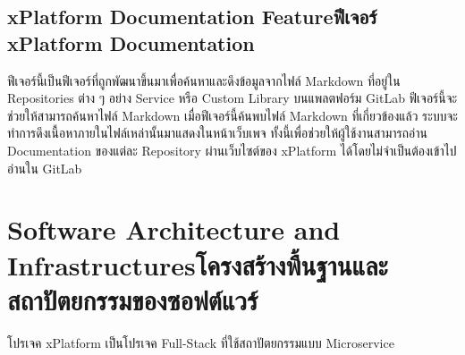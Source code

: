 \subsection{\ifenglish xPlatform Documentation Feature\else ฟีเจอร์ xPlatform Documentation \fi}
ฟีเจอร์นี้เป็นฟีเจอร์ที่ถูกพัฒนาขึ้นมาเพื่อค้นหาและดึงข้อมูลจากไฟล์ Markdown ที่อยู่ใน Repositories ต่าง ๆ อย่าง  Service หรือ Custom Library บนแพลตฟอร์ม GitLab ฟีเจอร์นี้จะช่วยให้สามารถค้นหาไฟล์ Markdown เมื่อฟีเจอร์นี้ค้นพบไฟล์ Markdown ที่เกี่ยวข้องแล้ว ระบบจะทำการดึงเนื้อหาภายในไฟล์เหล่านั้นมาแสดงในหน้าเว็บเพจ ทั้งนี้เพื่อช่วยให้ผู้ใช้งานสามารถอ่าน Documentation ของแต่ละ Repository ผ่านเว็บไซต์ของ xPlatform ได้โดยไม่จำเป็นต้องเข้าไปอ่านใน GitLab

\section{\ifenglish Software Architecture and Infrastructures\else โครงสร้างพื้นฐานและสถาปัตยกรรมของซอฟต์แวร์ \fi}
โปรเจค xPlatform เป็นโปรเจค Full-Stack ที่ใช้สถาปัตยกรรมแบบ Microservice
